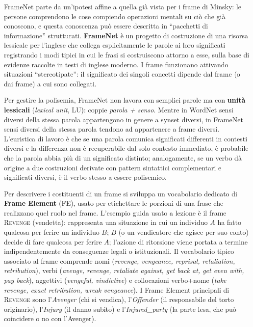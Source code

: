 \documentclass[11pt,a4paper]{report}
\begin{document}
FrameNet parte da un'ipotesi affine a quella già vista per i frame di Minsky: le persone comprendono le cose compiendo operazioni mentali su ciò che già conoscono, e questa conoscenza può essere descritta in ``pacchetti di informazione'' strutturati. \textbf{FrameNet} è un progetto di costruzione di una risorsa lessicale per l'inglese che collega esplicitamente le parole ai loro significati registrando i modi tipici in cui le frasi si costruiscono attorno a esse, sulla base di evidenze raccolte in testi di inglese moderno. I frame funzionano attivando situazioni ``stereotipate'': il significato dei singoli concetti dipende dal frame (o dai frame) a cui sono collegati.

Per gestire la polisemia, FrameNet non lavora con semplici parole ma con \textbf{unità lessicali} (\emph{lexical unit}, LU): coppie \emph{parola + senso}. Mentre in WordNet sensi diversi della stessa parola appartengono in genere a synset diversi, in FrameNet sensi diversi della stessa parola tendono ad appartenere a frame diversi. L'euristica di lavoro è che se una parola comunica significati differenti in contesti diversi e la differenza non è recuperabile dal solo contesto immediato, è probabile che la parola abbia più di un significato distinto; analogamente, se un verbo dà origine a due costruzioni derivate con pattern sintattici complementari e significati diversi, è il verbo stesso a essere polisemico.

Per descrivere i costituenti di un frame si sviluppa un vocabolario dedicato di \textbf{Frame Element} (FE), usato per etichettare le porzioni di una frase che realizzano quel ruolo nel frame. L'esempio guida usato a lezione è il frame \textsc{Revenge} (vendetta): rappresenta una situazione in cui un individuo $A$ ha fatto qualcosa per ferire un individuo $B$; $B$ (o un vendicatore che agisce per suo conto) decide di fare qualcosa per ferire $A$; l'azione di ritorsione viene portata a termine indipendentemente da conseguenze legali o istituzionali. Il vocabolario tipico associato al frame comprende nomi (\emph{revenge, vengeance, reprisal, retaliation, retribution}), verbi (\emph{avenge, revenge, retaliate against, get back at, get even with, pay back}), aggettivi (\emph{vengeful, vindictive}) e collocazioni verbo+nome (\emph{take revenge, exact retribution, wreak vengeance}). I Frame Element principali di \textsc{Revenge} sono l'\emph{Avenger} (chi si vendica), l'\emph{Offender} (il responsabile del torto originario), l'\emph{Injury} (il danno subito) e l'\emph{Injured\_party} (la parte lesa, che può coincidere o no con l'Avenger).
\end{document}
